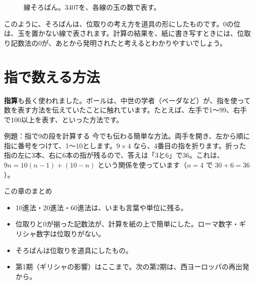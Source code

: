 \documentclass[a4paper,11pt,openany]{ltjsbook}
\begin{document}
\begin{figure}[htbp]
\centering
{}
\caption{線そろばん。3407を、各線の玉の数で表す。}
\end{figure}

このように、そろばんは、位取りの考え方を道具の形にしたものです。0の位は、玉を置かない線で表されます。計算の結果を、紙に書き写すときには、位取り記数法の0が、あとから発明されたと考えるとわかりやすいでしょう。

\section{指で数える方法}

\textbf{指算}も長く使われました。ボールは、中世の学者（ベーダなど）が、指を使って数を表す方法を伝えていたことに触れています。たとえば、左手で1〜99、右手で100以上を表す、といった方法です。

\begin{examplebox}{例題：指で9の段を計算する}
今でも伝わる簡単な方法。両手を開き、左から順に指に番号をつけて、1〜10とします。$9\times4$ なら、4番目の指を折ります。折った指の左に3本、右に6本の指が残るので、答えは「3と6」で36。これは、$9n=10(n-1)+(10-n)$ という関係を使っています（$n=4$ で $30+6=36$）。
\end{examplebox}

\begin{pointbox}{この章のまとめ}
\begin{itemize}[leftmargin=*]
\item 10進法・20進法・60進法は、いまも言葉や単位に残る。
\item 位取りと0が揃った記数法が、計算を紙の上で簡単にした。ローマ数字・ギリシャ数字は位取りがない。
\item そろばんは位取りを道具にしたもの。
\item 第1期（ギリシャの影響）はここまで。次の第2期は、西ヨーロッパの再出発から。
\end{itemize}
\end{pointbox}
\end{document}
